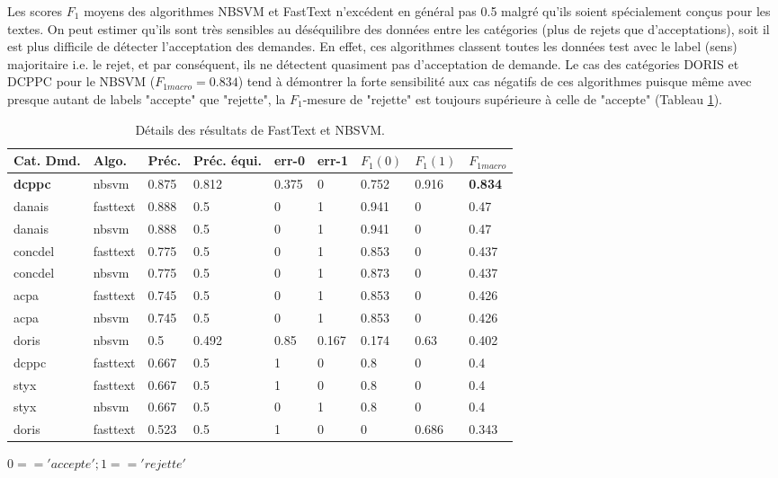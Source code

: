  Les scores $F_1$ moyens des algorithmes  NBSVM et FastText n'excédent en général pas 0.5 malgré qu'ils soient spécialement conçus pour les textes. On peut estimer qu'ils sont très sensibles au déséquilibre des données entre les catégories (plus de rejets que d'acceptations), soit il est plus difficile de détecter l'acceptation des demandes. En effet, ces algorithmes classent toutes les données test avec le label (sens) majoritaire i.e. le rejet, et par conséquent, ils ne détectent quasiment pas d'acceptation de demande. Le cas des catégories DORIS et DCPPC pour le NBSVM ($F_{1macro} = 0.834$) tend à démontrer la forte sensibilité aux cas négatifs de ces algorithmes puisque même avec presque autant de labels "accepte" que "rejette", la $F_1$-mesure de "rejette" est toujours supérieure à celle de "accepte" (Tableau \ref{tab:sensrst:fasttextnbsvm}). 
 
 \begin{table}[htb]
 	\footnotesize \centering
 	\begin{tabular}{|l|l|l|l|l|l|l|l|l|}
 		\hline
 	\textbf{Cat. Dmd.} & \textbf{Algo.} & \textbf{Préc.}   & \textbf{Préc. équi.} & \textbf{err-0} & \textbf{err-1} & $F_1(0)$  & $F_1(1)$  & \textbf{$F_{1macro}$} \\ \hline
 	\textbf{dcppc}       & nbsvm      & 0.875 & 0.812        & 0.375 & 0     & 0.752 & 0.916 & \textbf{0.834}        \\ \hline
 	danais      & fasttext   & 0.888 & 0.5          & 0     & 1     & 0.941    & 0 & 0.47         \\ \hline
 	danais      & nbsvm      & 0.888 & 0.5          & 0     & 1     & 0.941 & 0     & 0.47         \\ \hline
 	concdel     & fasttext   & 0.775 & 0.5          & 0     & 1     & 0.853     & 0 & 0.437        \\ \hline
 	concdel     & nbsvm      & 0.775 & 0.5          & 0     & 1     & 0.873 & 0     & 0.437        \\ \hline
 	acpa        & fasttext   & 0.745 & 0.5          & 0     & 1     & 0.853     & 0 & 0.426        \\ \hline
 	acpa        & nbsvm      & 0.745 & 0.5          & 0     & 1     & 0.853 & 0     & 0.426        \\ \hline
 	doris       & nbsvm      & 0.5   & 0.492        & 0.85  & 0.167 & 0.174 & 0.63  & 0.402        \\ \hline
 	dcppc       & fasttext   & 0.667 & 0.5          & 1     & 0     & 0.8   & 0     & 0.4          \\ \hline
 	styx        & fasttext   & 0.667 & 0.5          & 1     & 0     & 0.8     & 0   & 0.4          \\ \hline
 	styx        & nbsvm      & 0.667 & 0.5          & 0     & 1     & 0.8   & 0     & 0.4          \\ \hline
 	doris & fasttext & 0.523 & 0.5 & 1 & 0 & 0 & 0.686 & 0.343 \\ \hline
 	\end{tabular}
 	
 $0 == 'accepte'; 1 == 'rejette'$

\caption{Détails des résultats de FastText et NBSVM.}\label{tab:sensrst:fasttextnbsvm}
 \end{table}

